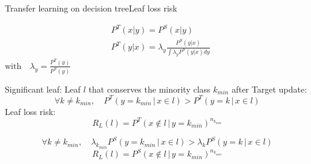\begin{frame}{Transfer learning on decision tree}{Leaf loss risk}

\begin{minipage}[t]{0.38\textwidth}
    \vspace{0pt}
    \begin{tcolorbox}[title=Homogeneous class imbalance,size=title,boxrule=0.2pt]
    \begin{align*}
        & P^T(x|y) = P^S(x|y) \\
        & P^T(y|x) = \lambda_y \frac{P^S(y|x)}{\int{\lambda_y P^S(y|x)dy}}
    \end{align*}
        $\text{with} \quad \lambda_y = \frac{P^T(y)}{P^S(y)}$
    \end{tcolorbox}
\end{minipage}\hfill
\begin{minipage}[t]{0.59\textwidth}
    \vspace{0pt}
    \pause
    \begin{tcolorbox}[title=Leaf loss risk,size=title,boxrule=0.2pt]
            Significant leaf: Leaf $l$ that conserves the minority class $k_{min}$ after Target update:
        \begin{equation*}
        \forall k \neq k_{min},\quad {P}^T(y = k_{min} \,|\, x \in l) > {P}^T(y = k \,|\, x \in l) 
        \label{eqF_rep_targ}
        \end{equation*}
        Leaf loss risk:
        \begin{equation*}
        R_{L}(l)={P}^T(x \notin l \,|\, y = k_{min})^{n_{k_{min}}} 
        \label{eq_risk_value}
        \end{equation*}
    \end{tcolorbox}
\end{minipage}
\pause
\begin{tcolorbox}[title=Leaf loss risk under homogeneous class imbalance,size=title,boxrule=0.2pt]
    \begin{equation*}
    \forall k \neq k_{min}, \quad \lambda_{k_{min}}  {P}^S(y = k_{min} \,|\, x \in l) > \lambda_k  {P}^S(y = k \,|\, x \in l)
    \end{equation*}
    \begin{equation*}
    R_{L}(l)={P}^S(x \notin l \,|\, y = k_{min})^{n_{k_{min}}}
    \end{equation*}
\end{tcolorbox}

\end{frame}

